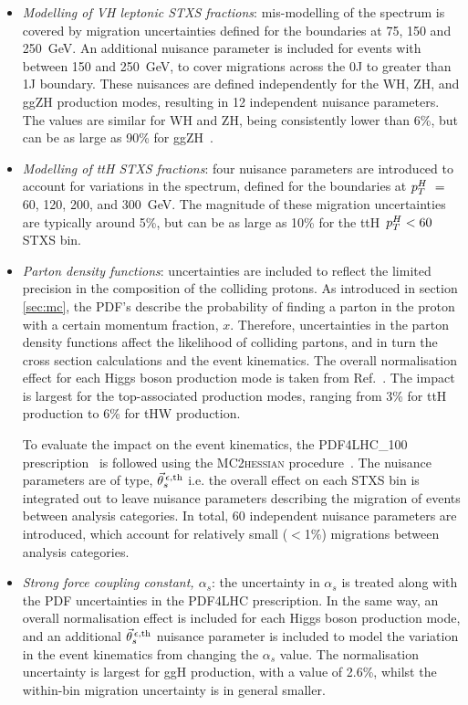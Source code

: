 \begin{itemize}
    \item \textit{Modelling of VH leptonic STXS fractions}: mis-modelling of the \ptV spectrum is covered by migration uncertainties defined for the boundaries at 75, 150 and 250~GeV. An additional nuisance parameter is included for events with \ptV between 150 and 250~GeV, to cover migrations across the 0J to greater than 1J boundary. These nuisances are defined independently for the WH, ZH, and ggZH production modes, resulting in 12 independent nuisance parameters. The values are similar for WH and ZH, being consistently lower than 6\%, but can be as large as 90\% for ggZH~\cite{ATL-PHYS-PUB-2018-035}. 
    
    \item \textit{Modelling of ttH STXS fractions}: four nuisance parameters are introduced to account for variations in the \ptH spectrum, defined for the boundaries at $p_T^H~=~$60, 120, 200, and 300~GeV. The magnitude of these migration uncertainties are typically around 5\%, but can be as large as 10\% for the ttH~$p_T^H<60$ STXS bin.
    
    \item \textit{Parton density functions}: uncertainties are included to reflect the limited precision in the composition of the colliding protons. As introduced in section \ref{sec:mc}, the PDF's describe the probability of finding a parton in the proton with a certain momentum fraction, $x$. Therefore, uncertainties in the parton density functions affect the likelihood of colliding partons, and in turn the cross section calculations and the event kinematics. The overall normalisation effect for each Higgs boson production mode is taken from Ref.~\cite{deFlorian:2016spz}. The impact is largest for the top-associated production modes, ranging from 3\% for ttH production to 6\% for tHW production.
    
    \noindent
    To evaluate the impact on the event kinematics, the PDF4LHC\_100 prescription~\cite{Ball:2014uwa,Butterworth:2015oua,Dulat:2015mca,Harland-Lang:2014zoa} is followed using the MC2\textsc{hessian} procedure~\cite{Carrazza:2015aoa,Gao:2013bia}. The nuisance parameters are of type, $\vec{\theta}^{\,\epsilon,{\rm{th}}}_{s}$ i.e. the overall effect on each STXS bin is integrated out to leave nuisance parameters describing the migration of events between analysis categories. In total, 60 independent nuisance parameters are introduced, which account for relatively small ($<$1\%) migrations between analysis categories.
    
    \item \textit{Strong force coupling constant, $\alpha_s$}: the uncertainty in $\alpha_s$ is treated along with the PDF uncertainties in the PDF4LHC prescription. In the same way, an overall normalisation effect is included for each Higgs boson production mode, and an additional $\vec{\theta}^{\,\epsilon,{\rm{th}}}_{s}$ nuisance parameter is included to model the variation in the event kinematics from changing the $\alpha_s$ value. The normalisation uncertainty is largest for ggH production, with a value of 2.6\%, whilst the within-bin migration uncertainty is in general smaller.
    

\end{itemize}
